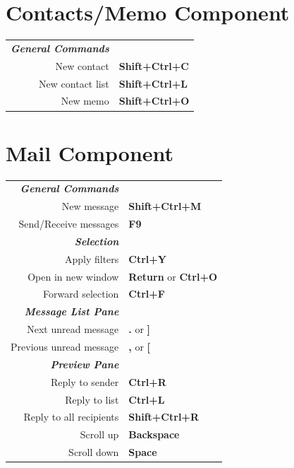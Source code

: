 \documentclass[12pt]{article}
\begin{document}
\begin{landscape}
\begin{center}
\begin{multicols}{2}
	\section*{Contacts/Memo Component}
	\begin{tabular*}{4in}{rp{1.5in}}
		\textit{\textbf{General Commands}}	&					\\
		New contact				& \textbf{Shift+Ctrl+C}			\\
		New contact list			& \textbf{Shift+Ctrl+L}			\\
		New memo				& \textbf{Shift+Ctrl+O}			\\
	\end{tabular*}
	\section*{Mail Component}
	\begin{tabular*}{4in}{rp{1.5in}}
		\textit{\textbf{General Commands}}	&					\\
		New message				& \textbf{Shift+Ctrl+M}			\\
		\vspace{1.5mm}
		Send/Receive messages			& \textbf{F9}				\\
		\textit{\textbf{Selection}}		&					\\
		Apply filters				& \textbf{Ctrl+Y}			\\
		Open in new window 			& \textbf{Return} or \textbf{Ctrl+O}	\\
		\vspace{1.5mm}
		Forward selection			& \textbf{Ctrl+F}			\\
		\textit{\textbf{Message List Pane}}	&					\\
		Next unread message			& \textbf{.} or \textbf{]}		\\
		\vspace{1.5mm}
		Previous unread message			& \textbf{,} or \textbf{[}		\\
		\textit{\textbf{Preview Pane}}		&					\\
		Reply to sender				& \textbf{Ctrl+R}			\\
		Reply to list				& \textbf{Ctrl+L}			\\
		Reply to all recipients 		& \textbf{Shift+Ctrl+R}			\\
		Scroll up				& \textbf{Backspace}			\\
		Scroll down				& \textbf{Space}			\\
	\end{tabular*}

\end{multicols}
\end{center}
\end{landscape}
\end{document}
